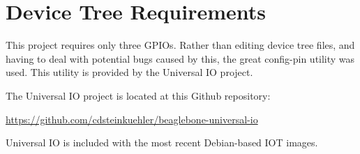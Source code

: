 %
%
%

\chapter{Device Tree Requirements}

This project requires only three GPIOs.  Rather than editing device tree files, 
and having to deal with potential bugs caused by this, the great config-pin 
utility was used.  This utility is provided by the Universal IO project.

The Universal IO project is located at this Github repository:

\url{https://github.com/cdsteinkuehler/beaglebone-universal-io}

Universal IO is included with the most recent Debian-based IOT images.




